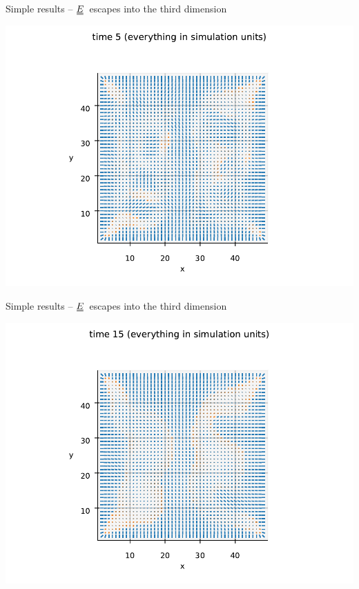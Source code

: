 \documentclass[10pt,mathserif]{beamer}
\newcommand{\duf}[2]{\stackunder[0.5pt]{\stackunder[0.8pt]{\stackunder[1pt]{\ensuremath{#1}}{\rule{\widthof{\ensuremath{#2}}*\real{0.9}}{.1ex}}}{\rule{\widthof{\ensuremath{#2}}*\real{0.9}}{.1ex}}}{}}
\newcommand{\du}[1]{\duf{#1}{#1}}
\newcommand{\EE}{\ensuremath{\du{E}}}
\begin{document}
\begin{frame}[fragile]{Simple results -- \EE\ escapes into the third dimension}
    \newrefsection
    \begin{center}
        \includegraphics[width=\textwidth]{figures/prelim1.pdf}
    \end{center}
\end{frame}

\begin{frame}[fragile]{Simple results -- \EE\ escapes into the third dimension}
    \newrefsection
    \begin{center}
        \includegraphics[width=\textwidth]{figures/prelim2.pdf}
    \end{center}
\end{frame}
\end{document}
